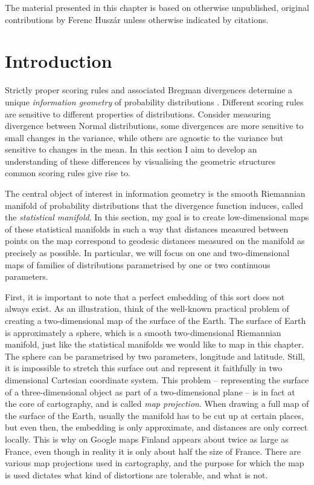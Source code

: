 \begin{summarycontributions}
The material presented in this chapter is based on otherwise unpublished, original contributions by Ferenc Husz\'{a}r unless otherwise indicated by citations.
\end{summarycontributions}
\section{Introduction}

Strictly proper scoring rules and associated Bregman divergences determine a unique \emph{information geometry} of probability distributions \citep{Dawid2007,Amari2010}. Different scoring rules are sensitive to different properties of distributions. Consider measuring divergence between Normal distributions, some divergences are more sensitive to small changes in the variance, while others are agnostic to the variance but sensitive to changes in the mean. In this section I aim to develop an understanding of these differences by visualising the geometric structures common scoring rules give rise to.

The central object of interest in information geometry is the smooth Riemannian manifold of probability distributions that the divergence function induces, called the \emph{statistical manifold}. In this section, my
goal is to create low-dimensional maps of these statistical manifolds in such a way that distances measured between points on the map correspond to geodesic distances measured on the manifold as precisely as possible. In particular, we will focus on one and two-dimensional maps of families of distributions parametrised by one or two continuous parameters.

First, it is important to note that a perfect embedding of this sort does not always exist. As an illustration, think of the well-known practical problem of creating a two-dimensional map of the surface of the Earth. The surface of Earth is approximately a sphere, which is a smooth two-dimensional Riemannian manifold, just like the statistical manifolds we would like to map in this chapter. The sphere can be parametrised by two parameters, longitude and latitude. Still, it is impossible to stretch this surface out and represent it faithfully in two dimensional Cartesian coordinate system. This problem -- representing the surface of a three-dimensional object as part of a two-dimensional plane -- is in fact at the core of cartography, and is called \emph{map projection}. When drawing a full map of the surface of the Earth, usually the manifold has to be cut up at certain places, but even then, the embedding is only approximate, and distances are only correct locally. This is why on Google maps Finland appears about twice as large as France, even though in reality it is only about half the size of France. There are various map projections used in cartography, and the purpose for which the map is used dictates what kind of distortions are tolerable, and what is not.

